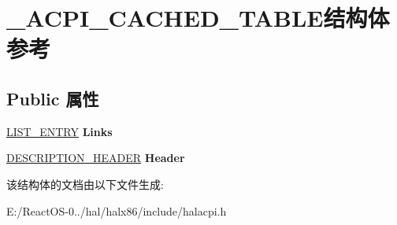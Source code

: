 \hypertarget{struct___a_c_p_i___c_a_c_h_e_d___t_a_b_l_e}{}\section{\+\_\+\+A\+C\+P\+I\+\_\+\+C\+A\+C\+H\+E\+D\+\_\+\+T\+A\+B\+L\+E结构体 参考}
\label{struct___a_c_p_i___c_a_c_h_e_d___t_a_b_l_e}
\subsection*{Public 属性}
\begin{DoxyCompactItemize}
\item 
\mbox{\label{struct___a_c_p_i___c_a_c_h_e_d___t_a_b_l_e_ace7fc717d56670f0a396323b8d53cf06}} 
\hyperlink{struct___l_i_s_t___e_n_t_r_y}{L\+I\+S\+T\+\_\+\+E\+N\+T\+RY} {\bfseries Links}
\item 
\mbox{\label{struct___a_c_p_i___c_a_c_h_e_d___t_a_b_l_e_adafb5b640a8cd50ca691d7ccc307fd3f}} 
\hyperlink{struct___d_e_s_c_r_i_p_t_i_o_n___h_e_a_d_e_r}{D\+E\+S\+C\+R\+I\+P\+T\+I\+O\+N\+\_\+\+H\+E\+A\+D\+ER} {\bfseries Header}
\end{DoxyCompactItemize}


该结构体的文档由以下文件生成\+:\begin{DoxyCompactItemize}
\item 
E\+:/\+React\+O\+S-\/0../hal/halx86/include/halacpi.\+h\end{DoxyCompactItemize}
